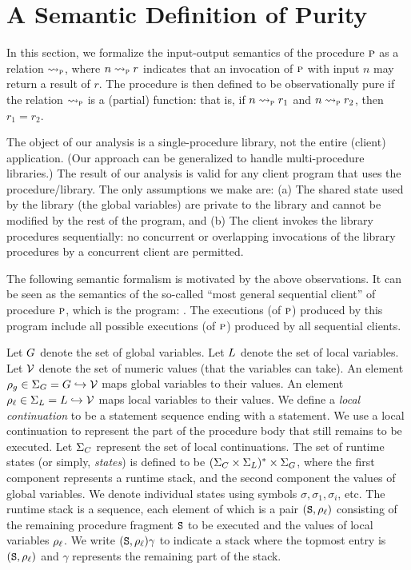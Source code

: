 \section{A Semantic Definition of Purity}
\label{sec:semantics}

In this section, we formalize the input-output semantics of the procedure $\textsc{p}$ as a relation $\rightsquigarrow_{\textsc{p}}$,
where $n \rightsquigarrow_{\textsc{p}} r$ indicates that an invocation of $\textsc{p}$ with input $n$ may return a result of $r$.
The procedure is then defined to be observationally pure if the relation $\rightsquigarrow_{\textsc{p}}$ is a (partial) function:
that is, if  $n \rightsquigarrow_{\textsc{p}} r_1$ and $n \rightsquigarrow_{\textsc{p}} r_2$, then $r_1 = r_2$.

The object of our analysis is a single-procedure library,  not the entire (client) application.
(Our approach can be generalized to handle multi-procedure libraries.)
The result of our analysis is valid for any client program that uses the procedure/library.  The only
assumptions we make are: (a) The shared state used by the library (the
global variables) are private to the library and cannot be modified by the
rest of the program, and (b) The client invokes the library procedures
sequentially: no concurrent or overlapping invocations of the library
procedures by a concurrent client are permitted.

The following semantic formalism is motivated by the above observations. It can be seen as the semantics
of the so-called ``most general sequential client'' of procedure $\textsc{p}$, which is the program:
.
The executions (of $\textsc{p}$) produced by this program include all possible executions (of $\textsc{p}$)  produced by all
sequential clients.

Let $G$ denote the set of global variables. Let $L$ denote the set of local variables.
Let $\mathcal{V}$ denote the set of numeric values (that the variables can take).
An element $\rho_g \in \Sigma_G = G \hookrightarrow \mathcal{V}$ maps global variables to their values.
An element $\rho_\ell \in \Sigma_L = L \hookrightarrow \mathcal{V}$ maps local variables to their values.
We define a \emph{local continuation} to be a statement sequence ending with a  statement.
We use a local continuation to represent the part of the procedure body that still remains to be
executed. Let $\Sigma_C$ represent the set of local continuations.
The set of runtime states (or simply, \emph{states}) is defined to be
$(\Sigma_C \times \Sigma_L)^* \times \Sigma_G$, where the first component
represents a runtime stack, and the second component the values of global
variables. We denote individual states using symbols $\sigma, \sigma_1,
\sigma_i$, etc. The runtime stack is a sequence, each element of which is a pair
$(\texttt{S},\rho_\ell)$ consisting of the remaining procedure fragment $\texttt{S}$ to
be executed and the values of local variables $\rho_\ell$.  We write
$(\texttt{S},\rho_\ell)\gamma$ to indicate a stack where the topmost entry is
$(\texttt{S},\rho_\ell)$ and $\gamma$ represents the remaining part of the stack.

